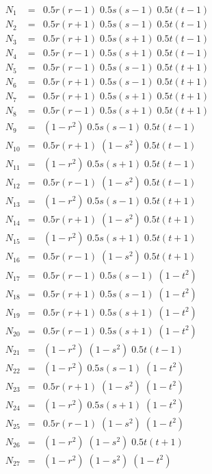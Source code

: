 \begin{eqnarray}
N_{1}&=& 0.5r(r-1)  \;0.5s(s-1)\; 0.5t(t-1)  \nonumber\\
N_{2}&=& 0.5r(r+1)  \;0.5s(s-1)\; 0.5t(t-1)  \nonumber\\
N_{3}&=& 0.5r(r+1)  \;0.5s(s+1)\; 0.5t(t-1)  \nonumber\\
N_{4}&=& 0.5r(r-1)  \;0.5s(s+1)\; 0.5t(t-1)  \nonumber\\
N_{5}&=& 0.5r(r-1)  \;0.5s(s-1)\; 0.5t(t+1)  \nonumber\\
N_{6}&=& 0.5r(r+1)  \;0.5s(s-1)\; 0.5t(t+1)  \nonumber\\
N_{7}&=& 0.5r(r+1)  \;0.5s(s+1)\; 0.5t(t+1)  \nonumber\\
N_{8}&=& 0.5r(r-1)  \;0.5s(s+1)\; 0.5t(t+1)  \nonumber\\
N_{9}&=& (1-r^2)   \;0.5s(s-1)\; 0.5t(t-1)  \nonumber\\
N_{10}&=& 0.5r(r+1) \;(1-s^2)  \; 0.5t(t-1)  \nonumber\\
N_{11}&=& (1-r^2)  \;0.5s(s+1)\; 0.5t(t-1)  \nonumber\\
N_{12}&=& 0.5r(r-1) \;(1-s^2)  \; 0.5t(t-1)  \nonumber\\
N_{13}&=& (1-r^2)  \;0.5s(s-1)\; 0.5t(t+1)  \nonumber\\
N_{14}&=& 0.5r(r+1) \;(1-s^2)  \; 0.5t(t+1)  \nonumber\\
N_{15}&=& (1-r^2)  \;0.5s(s+1)\; 0.5t(t+1)  \nonumber\\
N_{16}&=& 0.5r(r-1) \;(1-s^2)  \; 0.5t(t+1)  \nonumber\\
N_{17}&=& 0.5r(r-1) \;0.5s(s-1)\; (1-t^2)  \nonumber\\
N_{18}&=& 0.5r(r+1) \;0.5s(s-1)\; (1-t^2)  \nonumber\\
N_{19}&=& 0.5r(r+1) \;0.5s(s+1)\; (1-t^2)  \nonumber\\
N_{20}&=& 0.5r(r-1) \;0.5s(s+1)\; (1-t^2)  \nonumber\\
N_{21}&=& (1-r^2)   \;(1-s^2)  \; 0.5t(t-1)  \nonumber\\
N_{22}&=& (1-r^2)   \;0.5s(s-1)\; (1-t^2)  \nonumber\\
N_{23}&=& 0.5r(r+1) \;(1-s^2)  \; (1-t^2)  \nonumber\\
N_{24}&=& (1-r^2)   \;0.5s(s+1)\; (1-t^2)  \nonumber\\
N_{25}&=& 0.5r(r-1) \;(1-s^2)  \; (1-t^2)  \nonumber\\
N_{26}&=& (1-r^2)   \;(1-s^2)  \; 0.5t(t+1)  \nonumber\\
N_{27}&=& (1-r^2)   \;(1-s^2)  \; (1-t^2)  \nonumber
\end{eqnarray}

